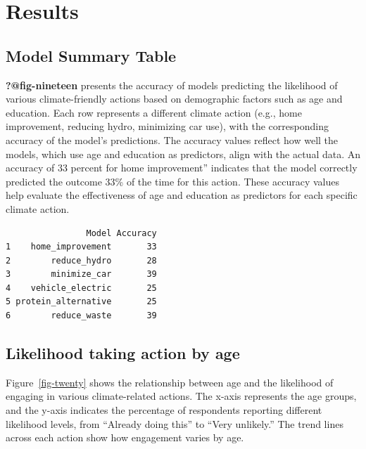 \documentclass[
  letterpaper,
  DIV=11,
  numbers=noendperiod]{scrartcl}
\begin{document}
\section{Results}\label{results}

\subsection{Model Summary Table}\label{model-summary-table}

\textbf{?@fig-nineteen} presents the accuracy of models predicting the
likelihood of various climate-friendly actions based on demographic
factors such as age and education. Each row represents a different
climate action (e.g., home improvement, reducing hydro, minimizing car
use), with the corresponding accuracy of the model's predictions. The
accuracy values reflect how well the models, which use age and education
as predictors, align with the actual data. An accuracy of 33 percent for
home improvement'' indicates that the model correctly predicted the
outcome 33\% of the time for this action. These accuracy values help
evaluate the effectiveness of age and education as predictors for each
specific climate action.

\begin{verbatim}
                Model Accuracy
1    home_improvement       33
2        reduce_hydro       28
3        minimize_car       39
4    vehicle_electric       25
5 protein_alternative       25
6        reduce_waste       39
\end{verbatim}

\subsection{Likelihood taking action by
age}\label{likelihood-taking-action-by-age}

Figure~\ref{fig-twenty} shows the relationship between age and the
likelihood of engaging in various climate-related actions. The x-axis
represents the age groups, and the y-axis indicates the percentage of
respondents reporting different likelihood levels, from ``Already doing
this'' to ``Very unlikely.'' The trend lines across each action show how
engagement varies by age.
\end{document}
